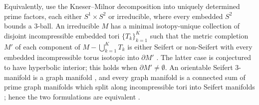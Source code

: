 Equivalently, use the Kneser--Milnor decomposition into uniquely determined
prime factors, each either $S^1\times S^2$ or irreducible, where every
embedded $S^2$ bounds a $3$-ball. An irreducible $M$ has a minimal
isotopy-unique collection of disjoint incompressible embedded tori
$\{T_k\}_{k=1}^K$ such that the metric completion $M'$ of each component of
$M-\bigcup_{k=1}^K T_k$ is either Seifert or non-Seifert with every embedded
incompressible torus isotopic into $\partial M'$ \cite{Scott}. The latter
case is conjectured to have hyperbolic interior; this holds when
$\partial M'\neq\emptyset$. An orientable Seifert $3$-manifold is a graph
manifold \cite[Proposition 2.4.2]{Matveev}, and every graph manifold is a
connected sum of prime graph manifolds which split along incompressible tori
into Seifert manifolds \cite[Proposition 2.4.7]{Matveev}; hence the two
formulations are equivalent \cite{Scott,Thurston}.
